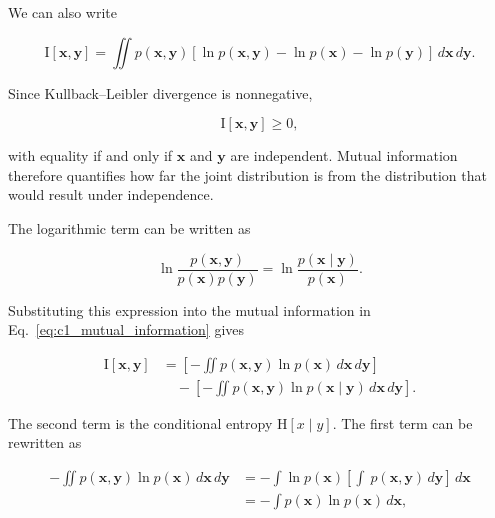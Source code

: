 \documentclass[10pt,twocolumn]{memoir}
\begin{document}
We can also write

\begin{equation}
    \mathrm{I}[\mathbf{x},\mathbf{y}] = \iint p(\mathbf{x},\mathbf{y}) \left[\ln p(\mathbf{x},\mathbf{y}) - \ln p(\mathbf{x}) - \ln p(\mathbf{y})\right]\,d\mathbf{x}\,d\mathbf{y}.
\label{eq:c1_mutual_information}
\end{equation}

Since Kullback--Leibler divergence is nonnegative,

\begin{equation}
    \mathrm{I}[\mathbf{x},\mathbf{y}] \geq 0,
\end{equation}

with equality if and only if $\mathbf{x}$ and $\mathbf{y}$ are independent. Mutual information therefore quantifies how far the joint distribution is from the distribution that would result under independence.

The logarithmic term can be written as

\begin{equation}
    \ln\frac{p(\mathbf{x},\mathbf{y})}{p(\mathbf{x})p(\mathbf{y})} = \ln \frac{p(\mathbf{x}\mid\mathbf{y})}{p(\mathbf{x})}.
\end{equation}

Substituting this expression into the mutual information in Eq.~\ref{eq:c1_mutual_information} gives

\begin{equation}
\begin{aligned}
    \mathrm{I}[\mathbf{x},\mathbf{y}]
    &= \left[-\iint p(\mathbf{x},\mathbf{y})\ln p(\mathbf{x})\,d\mathbf{x}\,d\mathbf{y}\right] \\
    &\quad- \left[-\iint p(\mathbf{x},\mathbf{y})\ln p(\mathbf{x}\mid\mathbf{y})\,d\mathbf{x}\,d\mathbf{y}\right].
\end{aligned}
\end{equation}

The second term is the conditional entropy $\mathrm{H}[x\mid y]$. The first term can be rewritten as

\begin{equation}
\begin{aligned}
    -\iint p(\mathbf{x},\mathbf{y})\ln p(\mathbf{x})\,d\mathbf{x}\,d\mathbf{y}
    &= -\int \ln p(\mathbf{x})\left[\int\ p(\mathbf{x},\mathbf{y})\,d\mathbf{y}\right]\,d\mathbf{x} \\
    &= -\int p(\mathbf{x}) \ln p(\mathbf{x})\,d\mathbf{x},
\end{aligned}
\end{equation}
\end{document}
